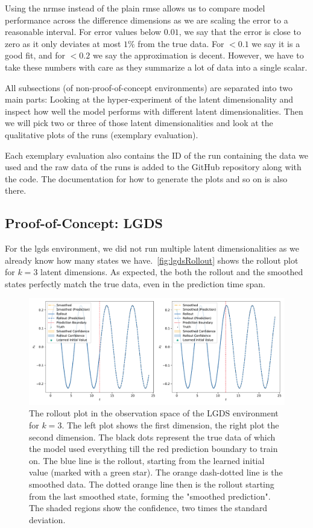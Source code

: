 	Using the \ac{nrmse} instead of the plain \ac{rmse} allows us to compare model performance across the difference dimensions as we are scaling the error to a reasonable interval. For error values below \( 0.01 \), we say that the error is close to zero as it only deviates at most \(1\%\) from the true data. For \(<0.1\) we say it is a good fit, and for \(<0.2\) we say the approximation is decent. However, we have to take these numbers with care as they summarize a lot of data into a single scalar.

	All subsections (of non-proof-of-concept environments) are separated into two main parts: Looking at the hyper-experiment of the latent dimensionality and inspect how well the model performs with different latent dimensionalities. Then we will pick two or three of those latent dimensionalities and look at the qualitative plots of the runs (exemplary evaluation).

	Each exemplary evaluation also contains the ID of the run containing the data we used and the raw data of the runs is added to the GitHub repository along with the code. The documentation for how to generate the plots and so on is also there.

	\subsection{Proof-of-Concept: LGDS}
		For the \ac{lgds} environment, we did not run multiple latent dimensionalities as we already know how many states we have.~\autoref{fig:lgdsRollout} shows the rollout plot for \( k = 3 \) latent dimensions. As expected, the both the rollout and the smoothed states perfectly match the true data, even in the prediction time span.

		\begin{figure}
			\centering
			\includegraphics[width=\linewidth]{figures/results/lgds/rollout-observations-N0.pdf}
			\caption[Rollout of the proof-of-concept LGDS experiment for 3 latent dimensions]{The rollout plot in the observation space of the LGDS environment for \(k = 3\). The left plot shows the first dimension, the right plot the second dimension. The black dots represent the true data of which the model used everything till the red prediction boundary to train on. The blue line is the rollout, starting from the learned initial value (marked with a green star). The orange dash-dotted line is the smoothed data. The dotted orange line then is the rollout starting from the last smoothed state, forming the "smoothed prediction". The shaded regions show the confidence, \ie two times the standard deviation.}
			\label{fig:lgdsRollout}
		\end{figure}

